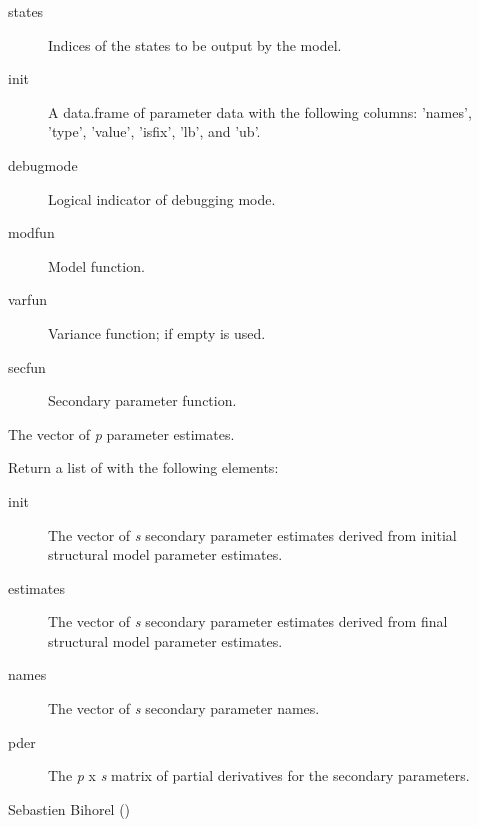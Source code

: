 \begin{Arguments}
\begin{ldescription}
\begin{description}
\begin{description}
\end{description}

\item[states] Indices of the states to be output by the model.
\item[init] A data.frame of parameter data with the following columns:
'names', 'type', 'value', 'isfix', 'lb', and 'ub'.
\item[debugmode] Logical indicator of debugging mode.
\item[modfun] Model function.
\item[varfun] Variance function; if empty  is
used.
\item[secfun] Secondary parameter function.

\end{description}


\item[\code{x}] The vector of \emph{p} parameter estimates.
\end{ldescription}
\end{Arguments}
%
\begin{Value}
Return a list of with the following elements:\begin{description}

\item[init] The vector of \emph{s} secondary parameter estimates derived
from initial structural model parameter estimates.
\item[estimates] The vector of \emph{s} secondary parameter estimates
derived from final structural model parameter estimates.
\item[names] The vector of \emph{s} secondary parameter names.
\item[pder] The \emph{p} x \emph{s} matrix of partial derivatives for the
secondary parameters.

\end{description}

\end{Value}
%
\begin{Author}\relax
Sebastien Bihorel ()
\end{Author}
%
\begin{SeeAlso}\relax
{}
\end{SeeAlso}
